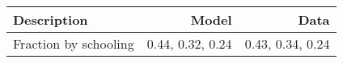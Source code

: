 \begin{tabular}{lrr}
\hline
Description & Model  & Data  \\
\hline
Fraction by schooling & 0.44, 0.32, 0.24  & 0.43, 0.34, 0.24  \\
\hline
\end{tabular}%
